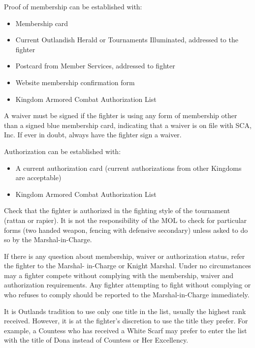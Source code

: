 \documentclass{article}
\begin{document}
Proof of membership can be established with:
\begin{itemize}
\item Membership card

\item Current Outlandish Herald or Tournaments Illuminated, addressed to the fighter

\item Postcard from Member Services, addressed to fighter

\item Website membership confirmation form

\item Kingdom Armored Combat Authorization List
\end{itemize}
A waiver must be signed if the fighter is using any form of membership other than a
signed blue membership card, indicating that a waiver is on file with SCA, Inc. If ever in doubt, always have the
fighter sign a waiver.

Authorization can be established with:

\begin{itemize}
\item A current authorization card (current authorizations from other Kingdoms are acceptable)

\item Kingdom Armored Combat Authorization List
\end{itemize}

Check that the fighter is authorized in the fighting style of the tournament (rattan or rapier). It is not the
responsibility of the MOL to check for particular forms (two handed weapon, fencing with defensive
secondary) unless asked to do so by the Marshal-in-Charge.


If there is any question about membership, waiver or authorization status, refer the fighter to the Marshal-
in-Charge or Knight Marshal. Under no circumstances may a fighter compete without complying with the
membership, waiver and authorization requirements. Any fighter attempting to fight without complying
or who refuses to comply should be reported to the Marshal-in-Charge immediately.

It is Outlands tradition to use only one title in the list, usually the highest rank received. However, it is at
the fighter’s discretion to use the title they prefer. For example, a Countess who has received a White
Scarf may prefer to enter the list with the title of Dona instead of Countess or Her Excellency.
\end{document}
